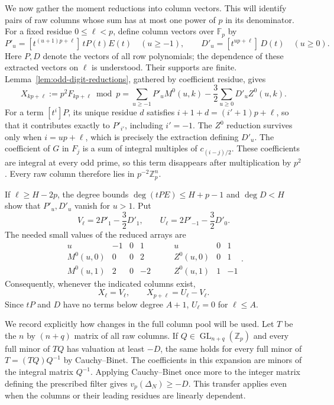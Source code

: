 We now gather the moment reductions into column vectors.  This will
identify pairs of raw columns whose sum has at most one power of $p$ in
its denominator.  For a fixed residue $0\le\ell<p$, define column vectors over
$\mathbb F_p$ by
\[
 P'_u=[t^{(u+1)p+\ell}]\,tP(t)E(t)\quad(u\ge-1),
 \qquad
 D'_u=[t^{up+\ell}]\,D(t)\quad(u\ge0).
\]
Here $P,D$ denote the vectors of all row polynomials; the dependence
of these extracted vectors on $\ell$ is understood.  Their supports
are finite.  Lemma~\ref{lem:odd-digit-reductions}, gathered by coefficient
residue, gives
\begin{equation}\label{eq:column-layer}
 X_{kp+\ell}:=p^2F_{kp+\ell}\bmod p
   =\sum_{u\ge-1}P'_uM^0(u,k)
          -\frac32\sum_{u\ge0}D'_uZ^0(u,k).
\end{equation}
For a term $[t^i]P$, its unique residue $d$ satisfies
$i+1+d=(i'+1)p+\ell$, so that it contributes exactly to $P'_{i'}$,
including $i'=-1$.  The $Z^0$ reduction survives only when
$i=up+\ell$, which is precisely the extraction defining $D'_u$.
The coefficient of $G$ in $F_j$ is a sum of integral multiples
of $c_{(i-j)/2}$.  These coefficients are integral at every odd prime,
so this term disappears after multiplication by $p^2$.  Every raw
column therefore lies in $p^{-2}\mathbb Z_p^n$.

If $\ell\ge H-2p$, the degree bounds
$\deg(tPE)\le H+p-1$ and $\deg D<H$ show that $P'_u,D'_u$ vanish
for $u>1$.  Put
\[
 V_\ell=2P'_1-\frac32D'_1,
 \qquad U_\ell=2P'_{-1}-\frac32D'_0.
\]
The needed small values of the reduced arrays are
\[
 \begin{array}{c|rrr}
 u&-1&0&1\\\hline
 M^0(u,0)&0&0&2\\
 M^0(u,1)&2&0&-2
 \end{array}
 \qquad
 \begin{array}{c|rr}
 u&0&1\\\hline
 Z^0(u,0)&0&1\\
 Z^0(u,1)&1&-1
 \end{array}.
\]
Consequently, whenever the indicated columns exist,
\begin{equation}\label{eq:odd-paired-layer}
 X_\ell=V_\ell,\qquad X_{p+\ell}=U_\ell-V_\ell.
\end{equation}
Since $tP$ and $D$ have no terms below degree $A+1$,
$U_\ell=0$ for $\ell\le A$.

We record explicitly how changes in the full column pool will be used.
Let $T$ be the $n$ by $(n+q)$ matrix of all raw columns.  If
$Q\in\operatorname{GL}_{n+q}(\mathbb Z_p)$ and every full minor of
$TQ$ has valuation at least $-D$, the same holds for every full minor
of $T=(TQ)Q^{-1}$ by Cauchy--Binet.  The coefficients in this expansion
are minors of the integral matrix $Q^{-1}$.  Applying Cauchy--Binet
once more to the integer matrix defining the prescribed filter gives
$v_p(\Delta_N)\ge-D$.  This transfer applies even when the columns or
their leading residues are linearly dependent.

